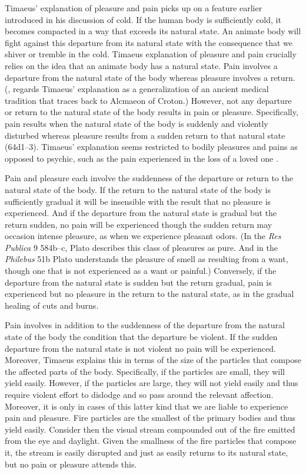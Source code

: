 Timaeus' explanation of pleasure and pain picks up on a feature earlier introduced in his discussion of cold. If the human body is sufficiently cold, it becomes compacted in a way that exceeds its natural state. An animate body will fight against this departure from its natural state with the consequence that we shiver or tremble in the cold. Timaeus explanation of pleasure and pain crucially relies on the idea that an animate body has a natural state. Pain involves a departure from the natural state of the body whereas pleasure involves a return. (\citealt[448--9]{Taylor:1928qb}, regards Timaeus' explanation as a generalization of an ancient medical tradition that traces back to Alcmaeon of Croton.) However, not any departure or return to the natural state of the body results in pain or pleasure. Specifically, pain results when the natural state of the body is suddenly and violently disturbed whereas pleasure results from a sudden return to that natural state (64d1--3). Timaeus' explanation seems restricted to bodily pleasures and pains as opposed to psychic, such as the pain experienced in the loss of a loved one \citep[447--8]{Taylor:1928qb}.

Pain and pleasure each involve the suddenness of the departure or return to the natural state of the body. If the return to the natural state of the body is sufficiently gradual it will be insensible with the result that no pleasure is experienced. And if the departure from the natural state is gradual but the return sudden, no pain will be experienced though the sudden return may occasion intense pleasure, as when we experience pleasant odors. (In the \emph{Res Publica} 9 584b--c, Plato describes this class of pleasures as pure. And in the \emph{Philebus} 51b Plato understands the pleasure of smell as resulting from a want, though one that is not experienced as a want or painful.) Conversely, if the departure from the natural state is sudden but the return gradual, pain is experienced but no pleasure in the return to the natural state, as in the gradual healing of cuts and burns.

Pain involves in addition to the suddenness of the departure from the natural state of the body the condition that the departure be violent. If the sudden departure from the natural state is not violent no pain will be experienced. Moreover, Timaeus explains this in terms of the size of the particles that compose the affected parts of the body. Specifically, if the particles are small, they will yield easily. However, if the particles are large, they will not yield easily and thus require violent effort to dislodge and so pass around the relevant affection. Moreover, it is only in cases of this latter kind that we are liable to experience pain and pleasure. Fire particles are the smallest of the primary bodies and thus yield easily. Consider then the visual stream compounded out of the fire emitted from the eye and daylight. Given the smallness of the fire particles that compose it, the stream is easily disrupted and just as easily returns to its natural state, but no pain or pleasure attends this.

